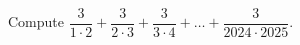 Compute $\dfrac{3}{1\cdot2}+\dfrac{3}{2\cdot3}+\dfrac{3}{3\cdot4}+\ldots+\dfrac{3}{2024\cdot2025}$.
